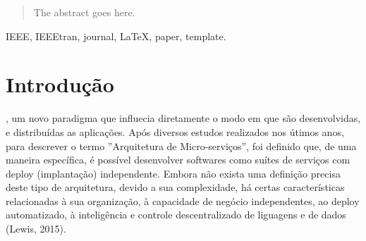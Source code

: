 \documentclass[journal]{IEEEtran}
\begin{document}







\maketitle

\begin{abstract}
The abstract goes here.
\end{abstract}

\begin{IEEEkeywords}
IEEE, IEEEtran, journal, \LaTeX, paper, template.
\end{IEEEkeywords}






%
\IEEEpeerreviewmaketitle



\section{Introdução}
% 
% 
% 
% 
, um novo paradigma que influecia diretamente o modo em que são desenvolvidas, e distribuídas as aplicações. Após diversos estudos realizados nos útimos anos, para descrever o termo ''Arquitetura de Micro-serviços'', foi definido que, de uma maneira específica, é possível desenvolver softwares como suítes de serviços com deploy (implantação) independente. Embora não exista uma definição precisa deste tipo de arquitetura, devido a sua complexidade, há certas características relacionadas à sua organização, à capacidade de negócio independentes, ao deploy automatizado, à inteligência e controle descentralizado de liguagens e de dados (Lewis, 2015).
\end{document}
